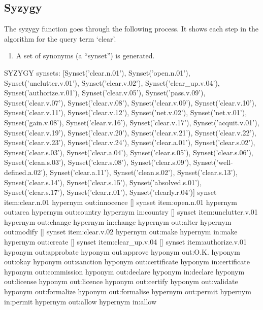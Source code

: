 \subsection{Syzygy}



The syzygy function goes through the following process.
It shows each step in the algorithm for the query term `clear'.
\begin{enumerate}
  \item A set of synonyms (a ``synset'') is generated.
\end{enumerate}

\begin{draft}
SYZYGY
synsets:
[Synset('clear.n.01'), Synset('open.n.01'), Synset('unclutter.v.01'), Synset('clear.v.02'), Synset('clear\_up.v.04'), Synset('authorize.v.01'), Synset('clear.v.05'), Synset('pass.v.09'), Synset('clear.v.07'), Synset('clear.v.08'), Synset('clear.v.09'), Synset('clear.v.10'), Synset('clear.v.11'), Synset('clear.v.12'), Synset('net.v.02'), Synset('net.v.01'), Synset('gain.v.08'), Synset('clear.v.16'), Synset('clear.v.17'), Synset('acquit.v.01'), Synset('clear.v.19'), Synset('clear.v.20'), Synset('clear.v.21'), Synset('clear.v.22'), Synset('clear.v.23'), Synset('clear.v.24'), Synset('clear.a.01'), Synset('clear.s.02'), Synset('clear.s.03'), Synset('clear.a.04'), Synset('clear.s.05'), Synset('clear.s.06'), Synset('clean.s.03'), Synset('clear.s.08'), Synset('clear.s.09'), Synset('well-defined.a.02'), Synset('clear.a.11'), Synset('clean.s.02'), Synset('clear.s.13'), Synset('clear.s.14'), Synset('clear.s.15'), Synset('absolved.s.01'), Synset('clear.s.17'), Synset('clear.r.01'), Synset('clearly.r.04')]
synset item:clear.n.01
hypernym out:innocence
[]
synset item:open.n.01
hypernym out:area
hypernym out:country
hypernym in:country
[]
synset item:unclutter.v.01
hypernym out:change
hypernym in:change
hypernym out:alter
hypernym out:modify
[]
synset item:clear.v.02
hypernym out:make
hypernym in:make
hypernym out:create
[]
synset item:clear\_up.v.04
[]
synset item:authorize.v.01
hyponym out:approbate
hyponym out:approve
hyponym out:O.K.
hyponym out:okay
hyponym out:sanction
hyponym out:certificate
hyponym in:certificate
hyponym out:commission
hyponym out:declare
hyponym in:declare
hyponym out:license
hyponym out:licence
hyponym out:certify
hyponym out:validate
hyponym out:formalize
hyponym out:formalise
hypernym out:permit
hypernym in:permit
hypernym out:allow
hypernym in:allow

\end{draft}
